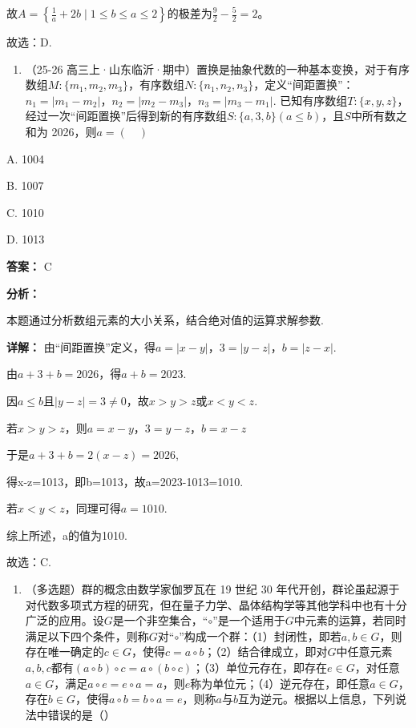 \documentclass[11pt,a4paper]{ctexart}
\begin{document}
故\(A = \left\{\frac{1}{a} + 2b \mid 1 \leq b \leq a \leq 2\right\}\)的极差为\(\frac{9}{2} - \frac{5}{2} = 2\)。

故选：D.

\begin{enumerate}[label=\arabic*., leftmargin=*, start=4]
\item （25-26
  高三上·山东临沂·期中）置换是抽象代数的一种基本变换，对于有序数组\(M: \{m_1, m_2, m_3\}\)，有序数组\(N: \{n_1, n_2, n_3\}\)，定义``间距置换''：\(n_1 = |m_1 - m_2|\)，\(n_2 = |m_2 - m_3|\)，\(n_3 = |m_3 - m_1|\).
  已知有序数组\(T: \{x, y, z\}\)，经过一次``间距置换''后得到新的有序数组\(S: \{a, 3, b\} (a \leq b)\)，且\(S\)中所有数之和为
  2026，则\(a = (\quad)\)
\end{enumerate}

A. 1004

B. 1007

C. 1010

D. 1013

\textbf{答案：}
C

\textbf{分析：}

本题通过分析数组元素的大小关系，结合绝对值的运算求解参数.

\textbf{详解：}
由``间距置换''定义，得\(a = |x - y|\)，\(3 = |y - z|\)，\(b = |z - x|\).

由\(a+3+b=2026\)，得\(a+b=2023\).

因\(a \leq b\)且\(|y - z| = 3 \neq 0\)，故\(x > y > z\)或\(x < y < z\).

若\(x > y > z\)，则\(a = x - y\)，\(3 = y - z\)，\(b = x - z\)

于是\(a+3+b=2(x-z)=2026\),

得x-z=1013，即b=1013，故a=2023-1013=1010.

若\(x < y < z\)，同理可得\(a = 1010\).

综上所述，a的值为1010.

故选：C.

\begin{enumerate}[label=\arabic*., leftmargin=*, start=5]
\item （多选题）群的概念由数学家伽罗瓦在 19 世纪 30
  年代开创，群论虽起源于对代数多项式方程的研究，但在量子力学、晶体结构学等其他学科中也有十分广泛的应用。设\(G\)是一个非空集合，``\(\circ\)''是一个适用于\(G\)中元素的运算，若同时满足以下四个条件，则称\(G\)对``\(\circ\)''构成一个群：（1）封闭性，即若\(a, b \in G\)，则存在唯一确定的\(c \in G\)，使得\(c = a \circ b\)；（2）结合律成立，即对\(G\)中任意元素\(a, b, c\)都有\((a\circ b)\circ c = a\circ(b\circ c)\)；（3）单位元存在，即存在\(e \in G\)，对任意\(a \in G\)，满足\(a\circ e = e\circ a = a\)，则\(e\)称为单位元；（4）逆元存在，即任意\(a \in G\)，存在\(b \in G\)，使得\(a\circ b = b\circ a = e\)，则称\(a\)与\(b\)互为逆元。根据以上信息，下列说法中错误的是（）
\end{enumerate}
\end{document}

